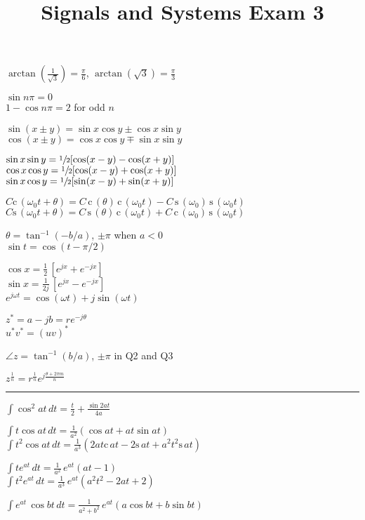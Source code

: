 \documentclass[4pt]{article}
\title{Signals and Systems Exam 3}
\theoremstyle{definition}
\theoremstyle{definition}
\renewcommand{\c}{\mathrm{c}\,}
\newcommand{\s}{\mathrm{s}\,}
\renewcommand{\o}{\omega}
\begin{document}
\raggedright
    $\arctan(\frac{1}{\sqrt{3}}) = \frac{\pi}{6}$,  $\arctan(\sqrt{3}) = \frac{\pi} 3$

    $\sin n\pi = 0$\\
    $1-\cos n\pi = 2$ for odd $n$

    $\sin(x\pm y) = \sin x \cos y \pm \cos x \sin y$\\
    $\cos(x\pm y) = \cos x \cos y \mp \sin x \sin y$

    $\sin x \sin y = \sfrac{1}{2}[\cos(x-y) - \cos(x+y)]$\\ %
    $\cos x \cos y = \sfrac{1}{2}[\cos(x-y) + \cos(x+y)]$\\
    $\sin x \cos y = \sfrac{1}{2}[\sin(x-y) + \sin(x+y)]$

    $C \c(\o_0 t + \theta) = C\,\c(\theta) \,\c(\o_0 t) - C\,\s(\o_0)\,\s(\o_0 t)$\\        %
    $C \s(\o_0 t + \theta) = C\,\s(\theta) \,\c(\o_0 t) + C\,\c(\o_0)\,\s(\o_0 t)$

    $\theta = \tan^{-1} (-b/a)$, $\pm \pi$ when $a<0$\\
    $\sin t = \cos (t-\pi/2)$

    $\cos x = \frac{1}{2}\,[e^{jx} + e^{-jx}]$\\
    $\sin x = \frac{1}{2j}\, [e^{jx} - e^{-jx}]$\\
    $e^{j\o t} = \cos(\o t) + j\sin (\o t)$

    $z^* = a-jb = re^{-j\theta}$\\
    $u^* v^* = (uv)^*$

    $\angle z = \tan^{-1}(b/a)$, $\pm \pi$ in Q2 and Q3

    $z^{\frac 1 n} = r^{\frac 1 n} e^{j \frac{\theta + 2\pi m}{n}}$
\rule{\linewidth}{0.5pt}
    $\int \cos^2 at \, dt = \frac{t}{2} + \frac{\sin2at}{4a}$

    $\int t \cos at \, dt = \frac{1}{a^2}(\cos at + at\sin at)$\\
    $\int t^2 \cos at\, dt = \frac{1}{a^3}(2at\c at - 2\s at + a^2t^2\s at)$

    $\int te^{at}\, dt = \frac{1}{a^2} \, e^{at} (at-1)$\\
    $\int t^2 e^{at} \, dt = \frac{1}{a^3} \, e^{at} (a^2t^2 - 2at + 2)$

    $\int e^{at} \,\cos bt \, dt = \frac{1}{a^2+b^2} \,e^{at}(a\cos 
    bt + b \sin bt)$
\end{document}
